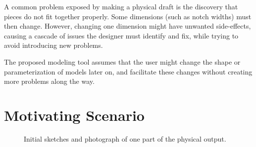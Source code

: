 \documentclass[11pt]{article}
\begin{document}
A common problem exposed by making a physical draft is the discovery
that pieces do not fit together properly. Some dimensions (such as
notch widths) must then change. However, changing one dimension might
have unwanted side-effects, causing a cascade of issues the designer
must identify and fix, while trying to avoid introducing new problems.

The proposed modeling tool assumes that the user might change the
shape or parameterization of models later on, and facilitate these
changes without creating more problems along the way. 

\section{Motivating Scenario}

\begin{figure}[] 
\centering
{}
\hspace{5mm} 
\hspace{5mm} 
\caption{Initial sketches and photograph of one part of the physical
  output.}
\label{fig:physical-sketches}
\end{figure}
\end{document}
